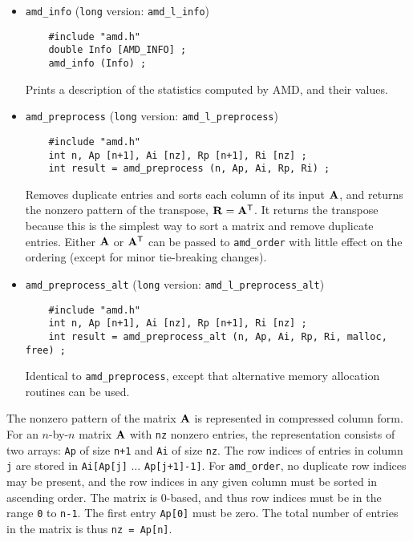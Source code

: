 \documentclass[11pt]{article}
\newcommand{\m}[1]{{\bf{#1}}}       %
\newcommand{\tr}{^{\sf T}}          %
\begin{document}
\begin{itemize}
\item {\tt amd\_info}
({\tt long} version: {\tt amd\_l\_info})
    {\footnotesize
    \begin{verbatim}
    #include "amd.h"
    double Info [AMD_INFO] ;
    amd_info (Info) ;
    \end{verbatim}
    }
    Prints a description of the statistics computed by AMD, and their values.

\item {\tt amd\_preprocess}
({\tt long} version: {\tt amd\_l\_preprocess})
    {\footnotesize
    \begin{verbatim}
    #include "amd.h"
    int n, Ap [n+1], Ai [nz], Rp [n+1], Ri [nz] ;
    int result = amd_preprocess (n, Ap, Ai, Rp, Ri) ;
    \end{verbatim}
    }
    Removes duplicate entries and sorts each column of its input $\m{A}$,
    and returns the nonzero pattern of the transpose, $\m{R}=\m{A}\tr$.
    It returns the transpose because this is the simplest way to sort
    a matrix and remove duplicate entries.  Either $\m{A}$ or $\m{A}\tr$
    can be passed to {\tt amd\_order} with little effect on the
    ordering (except for minor tie-breaking changes).

\item {\tt amd\_preprocess\_alt}
({\tt long} version: {\tt amd\_l\_preprocess\_alt})
    {\footnotesize
    \begin{verbatim}
    #include "amd.h"
    int n, Ap [n+1], Ai [nz], Rp [n+1], Ri [nz] ;
    int result = amd_preprocess_alt (n, Ap, Ai, Rp, Ri, malloc, free) ;
    \end{verbatim}
    }
    Identical to {\tt amd\_preprocess},
    except that alternative memory
    allocation routines can be used.
\end{itemize}

The nonzero pattern of the matrix $\m{A}$ is represented in compressed column
form.
For an $n$-by-$n$ matrix $\m{A}$ with {\tt nz} nonzero entries, the
representation consists of two arrays: {\tt Ap} of size {\tt n+1} and {\tt Ai}
of size {\tt nz}.  The row indices of entries in column {\tt j} are stored in
    {\tt Ai[Ap[j]} $\ldots$ {\tt Ap[j+1]-1]}.
For {\tt amd\_order},
no duplicate row indices may be present, and the row indices in any given
column must be sorted in ascending order.
The matrix is 0-based, and thus
row indices must be in the range {\tt 0} to {\tt n-1}.
The first entry {\tt Ap[0]} must be zero.
The total number of entries in the matrix is thus {\tt nz = Ap[n]}.
\end{document}
